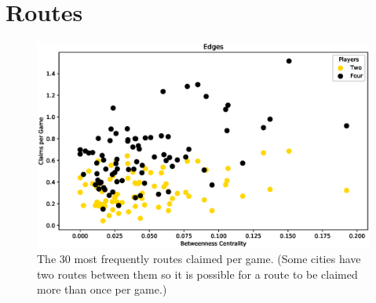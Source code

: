 \newpage
\section{Routes}

\begin{figure}[!ht]
\centering
\includegraphics[scale=.7]{figures/centrality_betweenness}
\caption{The 30 most frequently routes claimed
per game.
(Some cities have two routes between them so it is
possible for a route to be claimed more than once per game.)}
\label{fig:routes}
\end{figure}